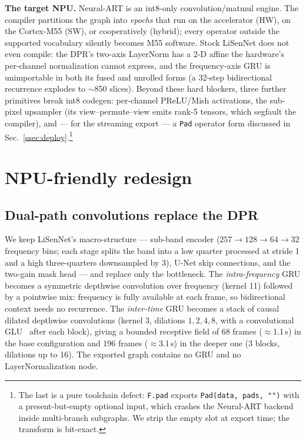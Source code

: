 \documentclass{article}
\begin{document}
\textbf{The target NPU.} Neural-ART is an int8-only convolution/matmul
engine. The compiler partitions the graph into \emph{epochs} that run on the
accelerator (HW), on the Cortex-M55 (SW), or cooperatively (hybrid); every
operator outside the supported vocabulary silently becomes M55 software.
Stock LiSenNet does not even compile: the DPR's two-axis LayerNorm has a 2-D
affine the hardware's per-channel normalization cannot express, and the
frequency-axis GRU is unimportable in both its fused and unrolled forms
(a 32-step bidirectional recurrence explodes to $\sim$850 slices). Beyond
these hard blockers, three further primitives break int8 codegen:
per-channel PReLU/Mish activations, the sub-pixel upsampler (its
view--permute--view emits rank-5 tensors, which segfault the compiler), and
--- for the streaming export --- a \texttt{Pad} operator form discussed in
Sec.~\ref{ssec:deploy}.\footnote{The last is a pure toolchain defect:
\texttt{F.pad} exports \texttt{Pad(data, pads, "")} with a present-but-empty
optional input, which crashes the Neural-ART backend inside multi-branch
subgraphs. We strip the empty slot at export time; the transform is
bit-exact.}

\section{NPU-friendly redesign}
\label{sec:redesign}


\subsection{Dual-path convolutions replace the DPR}
\label{ssec:dpc}

We keep LiSenNet's macro-structure --- sub-band encoder
($257\!\to\!128\!\to\!64\!\to\!32$ frequency bins; each stage splits the band
into a low quarter processed at stride 1 and a high three-quarters
downsampled by 3), U-Net skip connections, and the two-gain mask head --- and
replace only the bottleneck. The \emph{intra-frequency} GRU becomes a
symmetric depthwise convolution over frequency (kernel 11) followed by a
pointwise mix: frequency is fully available at each frame, so bidirectional
context needs no recurrence. The \emph{inter-time} GRU becomes a stack of
causal dilated depthwise convolutions (kernel 3, dilations $1,2,4,8$, with a
convolutional GLU~\cite{luo2019convtasnet} after each block), giving a
bounded receptive field of 68 frames ($\approx$1.1\,s) in the base
configuration and 196 frames ($\approx$3.1\,s) in the deeper one (3 blocks,
dilations up to 16). The exported graph contains no GRU and no
LayerNormalization node.
\end{document}
